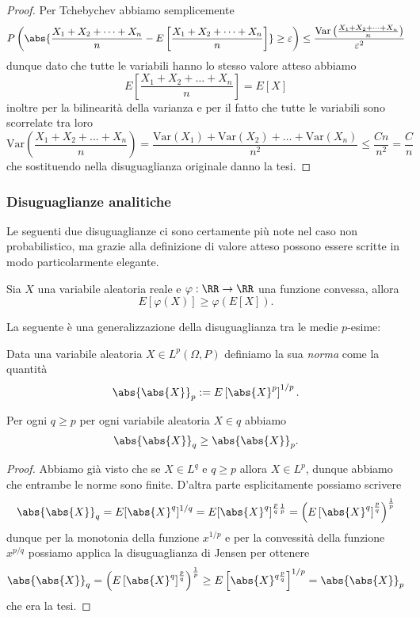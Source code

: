 \documentclass[11pt]{scrartcl}
\begin{document}
	\begin{proof}
		Per Tchebychev abbiamo semplicemente
		$$P\left(\abs{\frac{X_1+X_2+\dots+X_n}{n}-E\left[\frac{X_1+X_2+\dots+X_n}{n}\right]}\ge \varepsilon\right)\le \frac{\text{Var}\left(\frac{X_1+X_2+\dots+X_n}{n}\right)}{\varepsilon^2}$$
		dunque dato che tutte le variabili hanno lo stesso valore atteso abbiamo
		$$E\left[\frac{X_1+X_2+\dots+X_n}{n}\right]=E[X]$$
		inoltre per la bilinearità della varianza e per il fatto che tutte le variabili sono scorrelate tra loro
		$$\text{Var}\left(\frac{X_1+X_2+\dots+X_n}{n}\right)=\frac{\text{Var}(X_1)+\text{Var}(X_2)+\dots+\text{Var}(X_n)}{n^2}\le \frac{Cn}{n^2}=\frac{C}{n}$$
		che sostituendo nella disuguaglianza originale danno la tesi. 
	\end{proof}
	\subsubsection{Disuguaglianze analitiche}
	Le seguenti due disuguaglianze ci sono certamente più note nel caso non probabilistico, ma grazie alla definizione di valore atteso possono essere scritte in modo particolarmente elegante.
	\begin{theorem}
		Sia $X$ una variabile aleatoria reale e $\varphi:\RR\to\RR$ una funzione convessa, allora
		$$E\left[\varphi(X)\right]\ge \varphi\left(E[X]\right).$$ 
	\end{theorem}
	La seguente è una generalizzazione della disuguaglianza tra le medie $p$-esime:
	\begin{definition}[Norma $L^p$]
		Data una variabile aleatoria $X\in L^p(\Omega,P)$ definiamo la sua \textit{norma} come la quantità
		$$\abs{\abs{X}}_p:=E\left[\abs{X}^p\right]^{1/p}.$$
	\end{definition}
	\begin{theorem}
		Per ogni $q\ge p$ per ogni variabile aleatoria $X\in q$ abbiamo
		$$\abs{\abs{X}}_q\ge \abs{\abs{X}}_p.$$
	\end{theorem}
	\begin{proof}
		Abbiamo già visto che se $X\in L^q$ e $q\ge p$ allora $X\in L^p$, dunque abbiamo che entrambe le norme sono finite. D'altra parte esplicitamente possiamo scrivere
		$$\abs{\abs{X}}_q=E[\abs{X}^{q}]^{1/q}=E[\abs{X}^q]^{\frac{p}{q}\frac{1}{p}}=\left(E\left[\abs{X}^q\right]^{\frac{p}{q}}\right)^{\frac{1}{p}}$$
		dunque per la monotonia della funzione $x^{1/p}$ e per la convessità della funzione $x^{p/q}$ possiamo applica la disuguaglianza di Jensen per ottenere
		$$\abs{\abs{X}}_q=\left(E\left[\abs{X}^q\right]^{\frac{p}{q}}\right)^{\frac{1}{p}}\ge E\left[\abs{X}^{q\frac{p}{q}}\right]^{1/p}=\abs{\abs{X}}_p$$
		che era la tesi.
	\end{proof}
\end{document}

